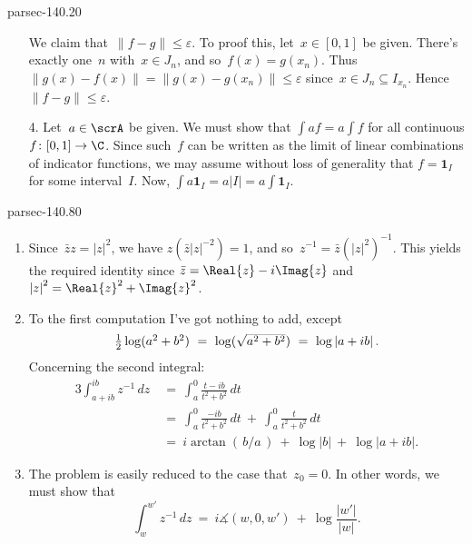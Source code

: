 \documentclass[b5page]{book}
\begin{document}
\begin{solution}{parsec-140.20}
\begin{enumerate}
We claim that~$\|f-g\|\leq \varepsilon$.
To proof this, let~$x\in [0,1]$ be given.
There's exactly one~$n$ with~$x\in J_n$,
and so~$f(x) = g(x_n)$.
Thus $\|g(x)-f(x)\|= \|g(x)-g(x_n)\|\leq \varepsilon$
since~$x\in J_n\subseteq I_{x_n}$.
Hence~$\|f-g\|\leq \varepsilon$.

\item[4.]
Let~$a\in\scrA$ be given.
We must show that
$\int af = a\int f$
for all continuous $f\colon [0,1]\to \C$.
Since such~$f$ can be written as the limit
of linear combinations
of indicator functions,
we may assume without loss of generality
that $f=\mathbf{1}_I$ for some interval~$I$.
Now,
$\int a \mathbf{1}_I = a \left|I\right|
= a \int \mathbf{1}_I$.
\end{enumerate}

\end{solution}
\begin{solution}{parsec-140.80}
    \begin{enumerate}
    \item
   Since~$\bar{z}z=\left|z\right|^2$,
            we have $z (\bar{z} \left|z\right|^{-2})=1$,
            and so~$z^{-1} = \bar{z} (\left|z\right|^2)^{-1}$.
This yields the required identity since
            $\bar{z}=\Real{z}-i\Imag{z}$
            and $\left|z\right|^2 = \Real{z}^2+ \Imag{z}^2$.
    \item
        To the first computation
            I've got nothing to add,
            except $$\textstyle \frac{1}{2}\log(a^2+b^2)
            \ =\  \smash{\log(\sqrt{a^2+b^2})} \ =\  
            \log\left|a+ib\right|.$$
    Concerning the second integral:
            \begin{alignat*}{3}
                \int_{a+ib}^{ib} z^{-1} \,dz 
                \ &=\ \int_a^0
                \frac{t-ib}{t^2+b^2}\,dt \\
                \ &=\ 
                \int_a^0
                \frac{-ib}{t^2+b^2}\,dt 
                \ +\ 
                \int_a^0
                \frac{t}{t^2+b^2}\,dt 
                \\
                \ &=\  i\arctan(\,b/a\,)
                \ + \  \log\left|b\right|
                \ + \ \log\left|a+ib\right|.
            \end{alignat*}
\item
The problem is easily reduced to the case that~$z_0=0$.
In other words,
we must show that
\begin{equation}
    \label{eq:14VIII}
    \int_w^{w'} z^{-1}
    \,dz \ =\ i\measuredangle(w,0,w')\ +\ \log\frac{\left|w'\right|}{\left|w\right|}.

\end{equation}
\end{enumerate}
\end{solution}
\end{document}
